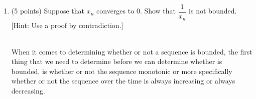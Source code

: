\documentclass[fleqn]{article}
\begin{document}
\begin{enumerate}
      \textcolor{hwColor}{
        \\
        \textbf{Basis: $k=1$}
        \\
        \\
        $
          1=1 \Longrightarrow L.H.S=R.H.S ~~~~ \checkmark 
        $
        \\
        \\
        \textbf{Induction:}
        \\
        \\
        Assume $1+2+...+n=\dfrac{n(n+1)}{2}$ is true for some $n=w$. Therefore, $1+2+...+w=\dfrac{w(w+1)}{2}$.
        \\
        \\
        Now we need to show that the statement is also true for $n=w+1$.
        \\
        \\
        $
          1+2+...+w+(w+1)=\dfrac{(w+1)\left[(w+1)+1\right]}{2}
          \\
          \\
          \\
          \therefore ~~~~ \dfrac{w(w+1)}{2}+(w+1)=\dfrac{(w+1)(k+2)}{2}
          \\
          \\
          \\
          \therefore ~~~~ \dfrac{w(w+1)}{2}+\dfrac{2(w+1)}{2}=\dfrac{(w+1)(w+2)}{2}
          \\
          \\
          \\
          \therefore ~~~~ w(w+1)+2(w+1)=(w+1)(w+2)
          \\
          \\
          \\
          \therefore ~~~~ w^2+w+2w+2=w^2+2w+w+2 ~~~~ \checkmark
        $
        \\
        \\
        So we basically showed that this is true for $n=w+1$.
      }


    \item (5 points) Suppose that $x_n$ converges to $0$. Show that $\dfrac{1}{x_n}$ is not bounded. 
    [Hint: Use a proof by contradiction.]

      \textcolor{hwColor}{
        \\
        When it comes to determining whether or not a sequence is bounded, the first thing that we need to determine before 
        we can determine whether is bounded, is whether or not the sequence monotonic or more specifically whether or not the sequence
        over the time is always increasing or always decreasing. 
      }



\end{enumerate}
\end{document}
